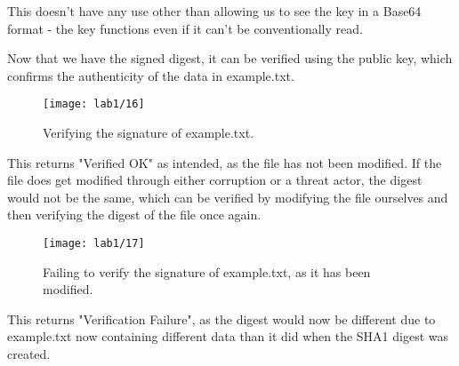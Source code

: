 This doesn't have any use other than allowing us to see the key in a Base64 format - the key functions even
if it can't be conventionally read. \newline

Now that we have the signed digest, it can be verified using the public key, which confirms the authenticity
of the data in example.txt.

\begin{figure}[H]
    \centering
    \texttt{[image: lab1/16]}
    \caption{Verifying the signature of example.txt.}
    \label{fig:signatureVerify}
\end{figure}

This returns "Verified OK" as intended, as the file has not been modified.
If the file does get modified through either corruption or a threat actor, the digest would not be the same,
which can be verified by modifying the file ourselves and then verifying the digest of the file once again.

\begin{figure}[H]
    \centering
    \texttt{[image: lab1/17]}
    \caption{Failing to verify the signature of example.txt, as it has been modified.}
    \label{fig:signatureVerifyFail}
\end{figure}

This returns "Verification Failure", as the digest would now be different due to example.txt now containing
different data than it did when the SHA1 digest was created.




